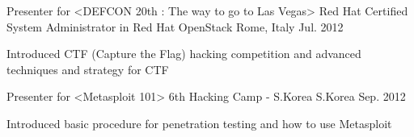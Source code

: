 


\begin{cventries}


\cventry
{Presenter for <DEFCON 20th : The way to go to Las Vegas>} %
{Red Hat Certified System Administrator in Red Hat OpenStack} %
{Rome, Italy} %
{Jul. 2012} %
{ %
\begin{cvitems}
\item {Introduced CTF (Capture the Flag) hacking competition and advanced techniques and strategy for CTF}
\end{cvitems}
}


\cventry
{Presenter for <Metasploit 101>} %
{6th Hacking Camp - S.Korea} %
{S.Korea} %
{Sep. 2012} %
{ %
\begin{cvitems}
\item {Introduced basic procedure for penetration testing and how to use Metasploit}
\end{cvitems}
}


\end{cventries}
